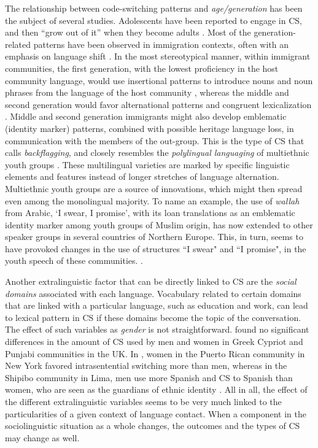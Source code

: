 \documentclass[output=paper]{langscibook}
\begin{document}
\begin{sloppypar}
The relationship between code-switching patterns and \textit{age/generation} has been the subject of several studies. Adolescents have been reported to engage in CS, and then “grow out of it” when they become adults \parencite[22]{muysken2000}. Most of the generation-related patterns have been observed in immigration contexts, often with an emphasis on language shift \parencites[227]{muysken2000}{kovacs2001code}. In the most stereotypical manner, within immigrant communities, the first generation, with the lowest proficiency in the host community language, would use insertional patterns to introduce nouns and noun phrases from the language of the host community \parencite{muysken2013language}, whereas the middle and second generation would favor alternational patterns and congruent lexicalization \parencite{muysken2000}. Middle and second generation immigrants might also develop emblematic (identity marker) patterns, combined with possible heritage language loss, in communication with the members of the out-group. This is the type of CS that \textcite{muysken2013language} calls \textit{backflagging}, and closely resembles the  \textit{polylingual languaging} of multiethnic youth groups \parencite{jorgensen2011polylanguaging}. These multilingual varieties are marked by specific linguistic elements and features instead of longer stretches of language alternation. Multiethnic youth groups are a source of innovations, which might then spread even among the monolingual majority. To name an example, the use of \textit{wallah} from Arabic, `I swear, I promise', with its loan translations as an emblematic identity marker among youth groups of Muslim origin, has now extended to other speaker groups in several countries of Northern Europe. This, in turn, seems to have provoked changes in the use of structures “I swear" and “I promise", in the youth speech of these communities. \parencite{kallmeyer2003linguistic,schoonen2005street,svendsen2008multiethnolectal,lehtonen2015tyylitellen}.
\end{sloppypar}

Another extralinguistic factor that can be directly linked to CS are the \textit{social domains} associated with each language. Vocabulary related to certain domains that are linked with a particular language, such as education and work, can lead to lexical pattern in CS if these domains become the topic of the conversation. The effect of such variables as \textit{gender} is not straightforward. \textcite[83]{gardner2009code} found no significant differences in the amount of CS used by men and women in Greek Cypriot and Punjabi communities in the UK. In \textcite{poplack1980sometimes},  women in the Puerto Rican community in New York favored intrasentential switching more than men, whereas in the Shipibo community in Lima, men use more Spanish and CS to Spanish than women, who are seen as the guardians of ethnic identity \parencite{zavala2008enra}. All in all, the effect of the different extralinguistic variables seems to be very much linked to the particularities of a given context of language contact. When a component in the sociolinguistic situation as a whole changes, the outcomes and the types of CS may change as well.
\end{document}
